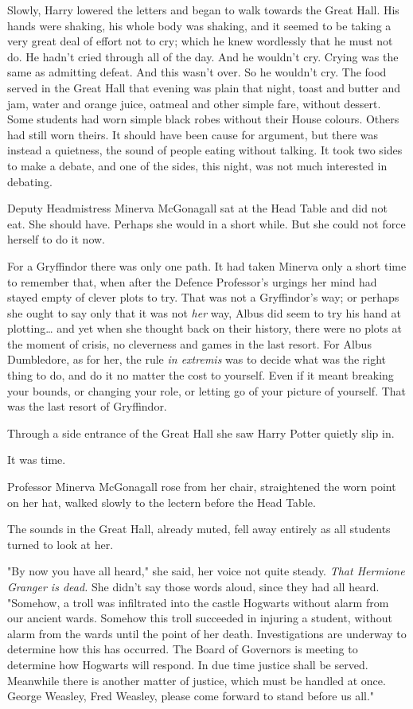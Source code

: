 Slowly, Harry lowered the letters and began to walk towards the Great Hall. His
hands were shaking, his whole body was shaking, and it seemed to be taking a
very great deal of effort not to cry; which he knew wordlessly that he must not
do. He hadn't cried through all of the day. And he wouldn't cry. Crying was the
same as admitting defeat. And this wasn't over. So he wouldn't cry.
\later
The food served in the Great Hall that evening was plain that night, toast and
butter and jam, water and orange juice, oatmeal and other simple fare, without
dessert. Some students had worn simple black robes without their House colours.
Others had still worn theirs. It should have been cause for argument, but there
was instead a quietness, the sound of people eating without talking. It took
two sides to make a debate, and one of the sides, this night, was not much
interested in debating.

Deputy Headmistress Minerva McGonagall sat at the Head Table and did not eat.
She should have. Perhaps she would in a short while. But she could not force
herself to do it now.

For a Gryffindor there was only one path. It had taken Minerva only a short
time to remember that, when after the Defence Professor's urgings her mind had
stayed empty of clever plots to try. That was not a Gryffindor's way; or
perhaps she ought to say only that it was not \emph{her} way, Albus did seem to
try his hand at plotting{\ldots} and yet when she thought back on their
history, there were no plots at the moment of crisis, no cleverness and games
in the last resort. For Albus Dumbledore, as for her, the rule \emph{in
extremis} was to decide what was the right thing to do, and do it no matter the
cost to yourself. Even if it meant breaking your bounds, or changing your role,
or letting go of your picture of yourself. That was the last resort of
Gryffindor.

Through a side entrance of the Great Hall she saw Harry Potter quietly slip in.

It was time.

Professor Minerva McGonagall rose from her chair, straightened the worn point
on her hat, walked slowly to the lectern before the Head Table.

The sounds in the Great Hall, already muted, fell away entirely as all students
turned to look at her.

"By now you have all heard," she said, her voice not quite steady. \emph{That
Hermione Granger is dead.} She didn't say those words aloud, since they had all
heard. "Somehow, a troll was infiltrated into the castle Hogwarts without alarm
from our ancient wards. Somehow this troll succeeded in injuring a student,
without alarm from the wards until the point of her death. Investigations are
underway to determine how this has occurred. The Board of Governors is meeting
to determine how Hogwarts will respond. In due time justice shall be served.
Meanwhile there is another matter of justice, which must be handled at once.
George Weasley, Fred Weasley, please come forward to stand before us all."

